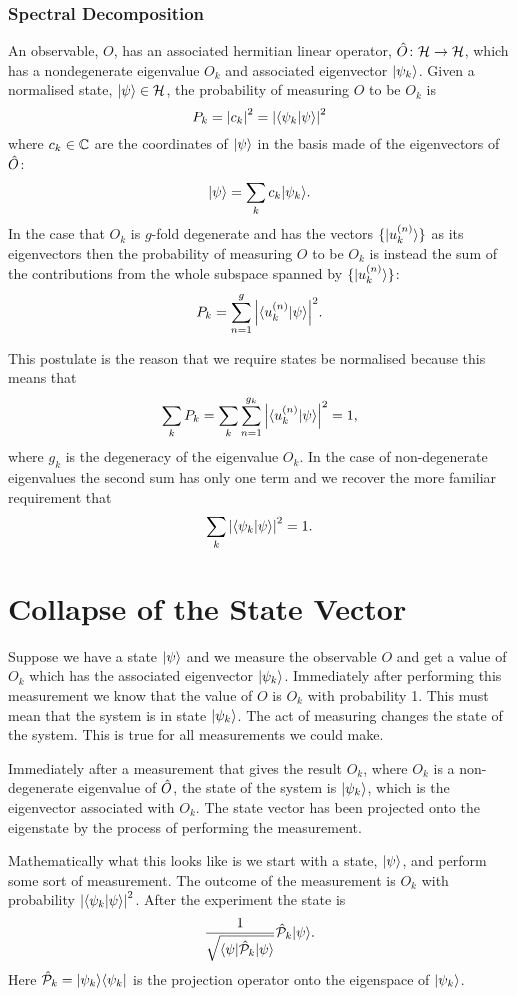     \subsubsection{Spectral Decomposition}
    \begin{postulate}{}{}
        An observable, \(O\), has an associated hermitian linear operator, \(\hat{O}\colon\mathcal{H}\to\mathcal{H}\), which has a nondegenerate eigenvalue \(O_k\) and associated eigenvector \(\vert {\psi_k} \rangle\).
        Given a normalised state, \(\vert {\psi} \rangle\in\mathcal{H}\), the probability of measuring \(O\) to be \(O_k\) is
        \[P_k = \abs{c_k}^2 = \abs{\langle {\psi_k} \vert {\psi} \rangle}^2\]
        where \(c_k\in\mathbb{C}\) are the coordinates of \(\vert {\psi} \rangle\) in the basis made of the eigenvectors of \(\hat{O}\):
        \[\vert {\psi} \rangle = \sum_{k}c_k\vert {\psi_k} \rangle.\]
        In the case that \(O_k\) is \(g\)-fold degenerate and has the vectors \(\{\vert {u_k^{(n)}} \rangle\}\) as its eigenvectors then the probability of measuring \(O\) to be \(O_k\) is instead the sum of the contributions from the whole subspace spanned by \(\{\vert {u_k^{(n)}} \rangle\}\):
        \[P_k = \sum_{n=1}^{g} \abs{\langle {u_k^{(n)}} \vert {\psi} \rangle}^2.\]
    \end{postulate}
    This postulate is the reason that we require states be normalised because this means that
    \[\sum_k P_k = \sum_k\sum_{n=1}^{g_k}\abs{\langle {u_k^{(n)}} \vert {\psi} \rangle}^2 = 1,\]
    where \(g_k\) is the degeneracy of the eigenvalue \(O_k\).
    In the case of non-degenerate eigenvalues the second sum has only one term and we recover the more familiar requirement that
    \[\sum_k \abs{\langle {\psi_k} \vert {\psi} \rangle}^2 = 1.\]
    
    
    \section{Collapse of the State Vector}
    Suppose we have a state \(\vert {\psi} \rangle\) and we measure the observable \(O\) and get a value of \(O_k\) which has the associated eigenvector \(\vert {\psi_k} \rangle\).
    Immediately after performing this measurement we know that the value of \(O\) is \(O_k\) with probability 1.
    This must mean that the system is in state \(\vert {\psi_k} \rangle\).
    The act of measuring changes the state of the system.
    This is true for all measurements we could make.
    \begin{postulate}{}{}
        Immediately after a measurement that gives the result \(O_k\), where \(O_k\) is a non-degenerate eigenvalue of \(\hat{O}\), the state of the system is \(\vert {\psi_k} \rangle\), which is the eigenvector associated with \(O_k\).
        The state vector has been projected onto the eigenstate by the process of performing the measurement.
    \end{postulate}
    Mathematically what this looks like is we start with a state, \(\vert {\psi} \rangle\), and perform some sort of measurement.
    The outcome of the measurement is \(O_k\) with probability \(\abs{\langle {\psi_k} \vert {\psi} \rangle}^2\).
    After the experiment the state is
    \[\frac{1}{\sqrt{\langle {\psi} \vert\hat{\mathcal{P}}_k\vert {\psi} \rangle}}\hat{\mathcal{P}}_k\vert {\psi} \rangle.\]
    Here \(\hat{\mathcal{P}}_k = \vert {\psi_k}\rangle\langle {\psi_k} \vert\) is the projection operator onto the eigenspace of \(\vert {\psi_k} \rangle\).
    
